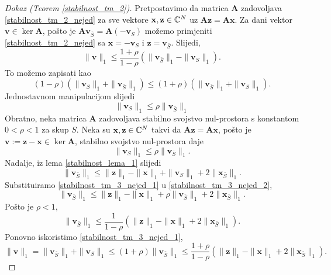 \documentclass[a4paper,twoside,12pt]{memoir} %
\newcommand{\vect}[1]{\mathbf{#1}}
\renewcommand{\vec}{\vect}
\newcommand{\norm}[1]{\|{#1}\|}
\begin{document}
\begin{proof}[Dokaz (Teorem \ref{stabilnost_tm_2})]
    Pretpostavimo da matrica $\vec A$ zadovoljava \eqref{stabilnost_tm_2_nejed} za sve vektore $\vec x, \vec z \in \C^N$ uz $\vec{Az} = \vec{Ax}$. Za dani vektor $\vec{v} \in \ker \vec A$, po\v{s}to je $\vec{Av}_{\bar S} = \vec A(-\vec v_S)$ mo\v{z}emo primjeniti \eqref{stabilnost_tm_2_nejed} sa $\vec x = - \vec v_S$ i $\vec z = \vec v_{\bar S}$. Slijedi,
    \begin{equation*}
        \norm{\vec v}_1 \leq \frac{1+\rho}{1-\rho}(\norm{\vec v_{\bar S}}_1 - \norm{\vec v_S}_1). 
    \end{equation*}
    To mo\v{z}emo zapisati kao 
    \begin{equation*}
        (1-\rho)(\norm{\vec v_S}_1 + \norm{\vec v_{\bar S}}_1)  \leq  (1+\rho)(\norm{\vec v_{\bar S}}_1 + \norm{\vec v_S}_1).
    \end{equation*}
    Jednostavnom manipulacijom slijedi
    \begin{equation*}
        \norm{\vec v_S}_1 \leq \rho \norm{\vec v_{\bar S}}_1 
    \end{equation*}
    \indent
    Obratno, neka matrica $\vec A$ zadovoljava stabilno svojstvo nul-prostora s konstantom $0<\rho<1$ za skup $S$. Neka su $\vec x, \vec z \in \C^N$ takvi da $\vec{Az} = \vec{Ax}$, po\v{s}to je $\vec v := \vec z - \vec x \in \ker \vec A$, stabilno svojstvo nul-prostora daje
    \begin{equation}\label{stabilnost_tm_3_nejed_1}
        \norm{\vec v_S}_1 \leq \rho \norm{\vec v_{\bar S}}_1.
    \end{equation}
    Nadalje, iz lema \ref{stabilnost_lema_1} slijedi
    \begin{equation}\label{stabilnost_tm_3_nejed_2}
        \norm{\vec v_{\bar S}}_1  \leq \norm{\vec z}_1 - \norm{\vec x}_1 + \norm{\vec v_S}_1 + 2 \norm{\vec x_{\bar S}}_1.
    \end{equation}
    Substituiramo \eqref{stabilnost_tm_3_nejed_1} u \eqref{stabilnost_tm_3_nejed_2},
    \begin{equation*}
        \norm{\vec v_{\bar S}}_1  \leq \norm{\vec z}_1 - \norm{\vec x}_1 + \rho\norm{\vec v_{\bar S}}_1 + 2 \norm{\vec x_{\bar S}}_1.
    \end{equation*}
    Po\v{s}to je $\rho < 1$,
    \begin{equation*}
        \norm{\vec v_{\bar S}}_1 \leq \frac{1}{1 - \rho}(\norm{\vec z}_1 - \norm{\vec x}_1 + 2\norm{\vec x_{\bar S}}_1).  
    \end{equation*}
    Ponovno iskoristimo \eqref{stabilnost_tm_3_nejed_1},
    \begin{equation*}
        \norm{\vec v}_1 = \norm{\vec v_{\bar S}}_1 +  \norm{\vec v_{S}}_1  \leq (1 + \rho) \norm{\vec v_{\bar S}}_1 \leq \frac{1+\rho}{1-\rho}(\norm{\vec z}_1 - \norm{\vec x}_1 + 2 \norm{\vec x_{\bar S}}_1).
    \end{equation*}
\end{proof}
\end{document}
